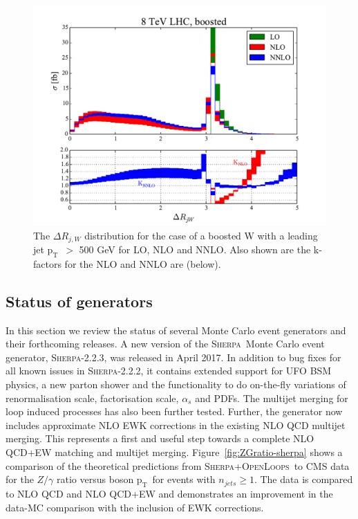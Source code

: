 \documentclass[a4paper,11pt,notoc]{article}
\newcommand{\pt}{\ensuremath{\mathrm{p_T}}}
\newcommand{\SHERPA}{\textsc{Sherpa}}
\newcommand{\OPENLOOPS}{\textsc{OpenLoops}}
\begin{document}
\begin{figure}[t!]
\centering
\includegraphics[width=0.495\columnwidth]{delrjW.pdf} 
\caption{The $\Delta R_{j,W}$ distribution for the case of a boosted W with a leading jet \pt\ $>$ 500 GeV for LO, NLO and NNLO. Also shown are the k-factors for the NLO and NNLO are (below).}
\label{fig:collinearW}
\end{figure}   


\subsection{Status of generators}
In this section we review the status of several Monte Carlo event generators and their forthcoming releases. 
A new version of the \SHERPA\ Monte Carlo event generator, \SHERPA-2.2.3, was released in April 2017. In addition to bug fixes for all known issues in \SHERPA-2.2.2, it contains extended support for UFO BSM physics, a new parton shower and the functionality to do on-the-fly variations of renormalisation scale, factorisation scale, $\alpha_s$ and PDFs. 
The multijet merging for loop induced processes has also been further tested. Further, the generator now includes approximate NLO EWK corrections in the existing NLO QCD multijet merging. This represents a first and useful step towards a complete NLO QCD+EW matching and multijet merging. 
Figure~\ref{fig:ZGratio-sherpa} shows a comparison of the theoretical predictions from \SHERPA+\OPENLOOPS\ to CMS data for the $Z/\gamma$ ratio versus boson \pt\ for events with $n_{jets} \ge 1$. The data is compared to NLO QCD and NLO QCD+EW and demonstrates an improvement in the data-MC comparison with the inclusion of EWK corrections. 

\end{document}
